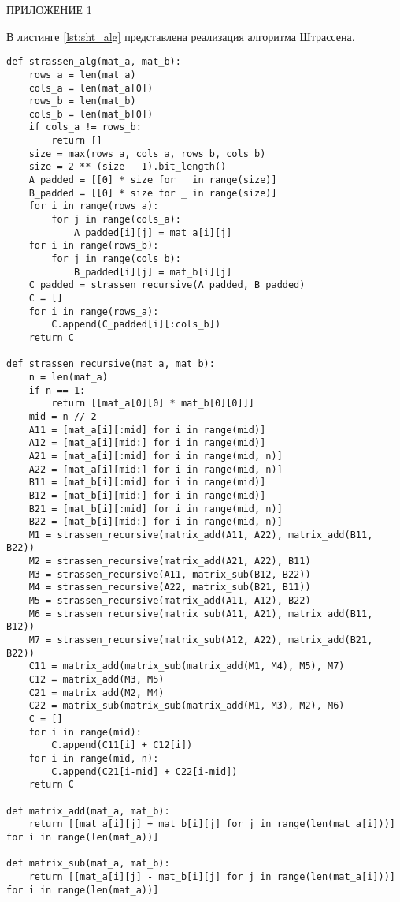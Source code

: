 \begin{appendix}
	\begin{center}
		ПРИЛОЖЕНИЕ 1
	\end{center}

В листинге \ref{lst:sht_alg} представлена реализация алгоритма Штрассена.
	\begin{center}
		\captionsetup{justification=raggedright,singlelinecheck=off}
	\begin{lstlisting}[label=lst:sht_alg,caption=Алгоритм Штрассена]
def strassen_alg(mat_a, mat_b):
	rows_a = len(mat_a)
	cols_a = len(mat_a[0])
	rows_b = len(mat_b)
	cols_b = len(mat_b[0])
	if cols_a != rows_b:
		return []
	size = max(rows_a, cols_a, rows_b, cols_b)
	size = 2 ** (size - 1).bit_length()
	A_padded = [[0] * size for _ in range(size)]
	B_padded = [[0] * size for _ in range(size)]
	for i in range(rows_a):
		for j in range(cols_a):
			A_padded[i][j] = mat_a[i][j]
	for i in range(rows_b):
		for j in range(cols_b):
			B_padded[i][j] = mat_b[i][j]
	C_padded = strassen_recursive(A_padded, B_padded)
	C = []
	for i in range(rows_a):
		C.append(C_padded[i][:cols_b])
	return C
	
def strassen_recursive(mat_a, mat_b):
	n = len(mat_a)
	if n == 1:
		return [[mat_a[0][0] * mat_b[0][0]]]
	mid = n // 2
	A11 = [mat_a[i][:mid] for i in range(mid)]
	A12 = [mat_a[i][mid:] for i in range(mid)]
	A21 = [mat_a[i][:mid] for i in range(mid, n)]
	A22 = [mat_a[i][mid:] for i in range(mid, n)]
	B11 = [mat_b[i][:mid] for i in range(mid)]
	B12 = [mat_b[i][mid:] for i in range(mid)]
	B21 = [mat_b[i][:mid] for i in range(mid, n)]
	B22 = [mat_b[i][mid:] for i in range(mid, n)]
	M1 = strassen_recursive(matrix_add(A11, A22), matrix_add(B11, B22))
	M2 = strassen_recursive(matrix_add(A21, A22), B11)
	M3 = strassen_recursive(A11, matrix_sub(B12, B22))
	M4 = strassen_recursive(A22, matrix_sub(B21, B11))
	M5 = strassen_recursive(matrix_add(A11, A12), B22)
	M6 = strassen_recursive(matrix_sub(A11, A21), matrix_add(B11, B12))
	M7 = strassen_recursive(matrix_sub(A12, A22), matrix_add(B21, B22))
	C11 = matrix_add(matrix_sub(matrix_add(M1, M4), M5), M7)
	C12 = matrix_add(M3, M5)
	C21 = matrix_add(M2, M4)
	C22 = matrix_sub(matrix_sub(matrix_add(M1, M3), M2), M6)
	C = []
	for i in range(mid):
		C.append(C11[i] + C12[i])
	for i in range(mid, n):
		C.append(C21[i-mid] + C22[i-mid])
	return C
	
def matrix_add(mat_a, mat_b):
	return [[mat_a[i][j] + mat_b[i][j] for j in range(len(mat_a[i]))] for i in range(len(mat_a))]
	
def matrix_sub(mat_a, mat_b):
	return [[mat_a[i][j] - mat_b[i][j] for j in range(len(mat_a[i]))] for i in range(len(mat_a))]
	\end{lstlisting}
\end{center}
\end{appendix}